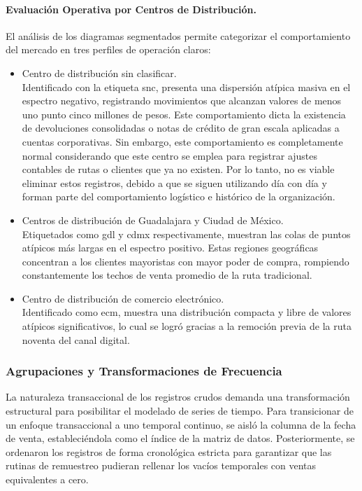 \documentclass[11pt,a4paper]{report}
\begin{document}
        \paragraph{Evaluación Operativa por Centros de Distribución.}
        El análisis de los diagramas segmentados permite categorizar el comportamiento del mercado en tres perfiles de operación claros:
        \begin{itemize}
            \item Centro de distribución sin clasificar.\\
            Identificado con la etiqueta snc, presenta una dispersión atípica masiva en el espectro negativo, registrando movimientos que
            alcanzan valores de menos uno punto cinco millones de pesos. Este comportamiento dicta la existencia de devoluciones consolidadas
            o notas de crédito de gran escala aplicadas a cuentas corporativas. Sin embargo, este comportamiento es completamente normal considerando
            que este centro se emplea para registrar ajustes contables de rutas o clientes que ya no existen. Por lo tanto, no es viable eliminar
            estos registros, debido a que se siguen utilizando día con día y forman parte del comportamiento logístico e histórico de la organización.

            \item Centros de distribución de Guadalajara y Ciudad de México.\\
            Etiquetados como gdl y cdmx respectivamente, muestran las colas de puntos atípicos más largas en el espectro positivo. Estas
            regiones geográficas concentran a los clientes mayoristas con mayor poder de compra, rompiendo constantemente los techos de venta promedio de la ruta tradicional.

            \item Centro de distribución de comercio electrónico.\\Identificado como ecm, muestra una distribución compacta y libre de valores
            atípicos significativos, lo cual se logró gracias a la remoción previa de la ruta noventa del canal digital.
        \end{itemize}

        \subsubsection{Agrupaciones y Transformaciones de Frecuencia}
            La naturaleza transaccional de los registros crudos demanda una transformación estructural para posibilitar
            el modelado de series de tiempo. Para transicionar de un enfoque transaccional a uno temporal continuo,
            se aisló la columna de la fecha de venta, estableciéndola como el índice de la matriz de datos. Posteriormente,
            se ordenaron los registros de forma cronológica estricta para garantizar que las rutinas de remuestreo pudieran
            rellenar los vacíos temporales con ventas equivalentes a cero.
            
\end{document}
